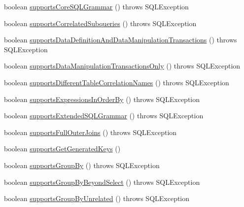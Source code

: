 \begin{DoxyCompactItemize}
\item 
boolean \mbox{\hyperlink{classcom_1_1mysql_1_1cj_1_1jdbc_1_1_database_meta_data_aaa4b1901adca2c017f21dc0943909859}{supports\+Core\+S\+Q\+L\+Grammar}} ()  throws S\+Q\+L\+Exception 
\item 
boolean \mbox{\hyperlink{classcom_1_1mysql_1_1cj_1_1jdbc_1_1_database_meta_data_aa8fae9e793548d9cac13ca227bd7e43c}{supports\+Correlated\+Subqueries}} ()  throws S\+Q\+L\+Exception 
\item 
boolean \mbox{\hyperlink{classcom_1_1mysql_1_1cj_1_1jdbc_1_1_database_meta_data_a2ade831ad8ba025596ec863ee0abe7fd}{supports\+Data\+Definition\+And\+Data\+Manipulation\+Transactions}} ()  throws S\+Q\+L\+Exception 
\item 
boolean \mbox{\hyperlink{classcom_1_1mysql_1_1cj_1_1jdbc_1_1_database_meta_data_aaba21a9c670c1397b023328c337a8d8f}{supports\+Data\+Manipulation\+Transactions\+Only}} ()  throws S\+Q\+L\+Exception 
\item 
boolean \mbox{\hyperlink{classcom_1_1mysql_1_1cj_1_1jdbc_1_1_database_meta_data_aa74636e442e66be1301fcda11e2a253f}{supports\+Different\+Table\+Correlation\+Names}} ()  throws S\+Q\+L\+Exception 
\item 
boolean \mbox{\hyperlink{classcom_1_1mysql_1_1cj_1_1jdbc_1_1_database_meta_data_a29f18a948ec16f38298bb5b999bf89c1}{supports\+Expressions\+In\+Order\+By}} ()  throws S\+Q\+L\+Exception 
\item 
boolean \mbox{\hyperlink{classcom_1_1mysql_1_1cj_1_1jdbc_1_1_database_meta_data_a6e8f775af5db51892785a928de469a58}{supports\+Extended\+S\+Q\+L\+Grammar}} ()  throws S\+Q\+L\+Exception 
\item 
boolean \mbox{\hyperlink{classcom_1_1mysql_1_1cj_1_1jdbc_1_1_database_meta_data_a50a0b715db01fb28b8de35d3a01cc5d4}{supports\+Full\+Outer\+Joins}} ()  throws S\+Q\+L\+Exception 
\item 
boolean \mbox{\hyperlink{classcom_1_1mysql_1_1cj_1_1jdbc_1_1_database_meta_data_a08f5b43c8177389c11a0f2c4a13f6426}{supports\+Get\+Generated\+Keys}} ()
\item 
boolean \mbox{\hyperlink{classcom_1_1mysql_1_1cj_1_1jdbc_1_1_database_meta_data_a3afb86e4ce9852aaf9683f6d1e9909d4}{supports\+Group\+By}} ()  throws S\+Q\+L\+Exception 
\item 
boolean \mbox{\hyperlink{classcom_1_1mysql_1_1cj_1_1jdbc_1_1_database_meta_data_a5655d927fa31f72f9733ce0c45198dfb}{supports\+Group\+By\+Beyond\+Select}} ()  throws S\+Q\+L\+Exception 
\item 
boolean \mbox{\hyperlink{classcom_1_1mysql_1_1cj_1_1jdbc_1_1_database_meta_data_a9bcc49c4561df257fc14d5c5fec1381d}{supports\+Group\+By\+Unrelated}} ()  throws S\+Q\+L\+Exception 

\end{DoxyCompactItemize}
